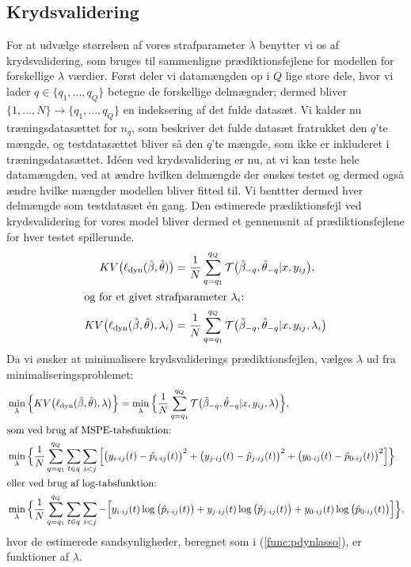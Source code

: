 \documentclass[11pt,a4paper]{article}
\begin{document}
\subsection{Krydsvalidering}
For at udvælge størrelsen af vores strafparameter $\lambda$ benytter vi os af krydsvalidering, som bruges til sammenligne prædiktionsfejlene for modellen for forskellige $\lambda$ værdier. Først deler vi datamængden op i $Q$ lige store dele, hvor vi lader $q\in \{q_1,...,q_Q\}$ betegne de forskellige delmægnder; dermed bliver $\{1,...,N\}\rightarrow\{q_1,...,q_Q\}$ en indeksering af det fulde datasæt. Vi kalder nu træningsdatasættet for $n_q$, som beskriver det fulde datasæt fratrukket den $q$'te mængde, og testdatasættet bliver så den $q$'te mængde, som ikke er inkluderet i træningsdatasættet. Idéen ved krydsvalidering er nu, at vi kan teste hele datamængden, ved at ændre hvilken delmængde der ønskes testet og dermed også ændre hvilke mængder modellen bliver fitted til. Vi benttter dermed hver delmængde som testdatasæt én gang. Den estimerede prædiktionsfejl ved krydsvalidering for vores model bliver dermed et gennemsnit
af prædiktionsfejlene for hver testet spillerunde. 
\begin{align*}
KV\big{(}\ell_{\text{dyn}}(\hat{\beta},\hat{\theta})\big{)}&=\frac{1}{N}\sum_{q=q_1}^{q_Q}\mathcal{T}\big{(}\hat{\beta}_{-q},\hat{\theta}_{-q}|x,y_{ij}\big{)},\\
\intertext{og for et givet strafparameter $\lambda_i$:}
KV\big{(}\ell_{\text{dyn}}(\hat{\beta},\hat{\theta}),\lambda_i\big{)}&=\frac{1}{N}\sum_{q=q_1}^{q_Q}\mathcal{T}\big{(}\hat{\beta}_{-q},\hat{\theta}_{-q}|x,y_{ij},\lambda_i\big{)}
\end{align*}
Da vi ønsker at minimalisere krydsvaliderings prædiktionsfejlen, vælges $\lambda$ ud fra minimaliseringsproblemet:
\begin{align*}
&\min_{\lambda}\Big{\{}KV\big{(}\ell_{\text{dyn}}(\hat{\beta},\hat{\theta}),\lambda \big{)}\Big{\}}=\min_{\lambda}\Big{\{}\frac{1}{N}\sum_{q=q_1}^{q_Q}\mathcal{T}\big{(}\hat{\beta}_{-q},\hat{\theta}_{-q}|x,y_{ij},\lambda\big{)}\Big{\}},\\
\intertext{som ved brug af MSPE-tabsfunktion:}
&\min_{\lambda}\Big{\{}\frac{1}{N}\sum_{q=q_1}^{q_Q}\sum_{t\in q}\sum_{i<j}\Big{[}\big{(}y_{i\cdot ij}(t)-\hat{p}_{i\cdot ij}(t)\big{)}^2+\big{(}y_{j\cdot ij}(t)-\hat{p}_{j\cdot ij}(t)\big{)}^2+\big{(}y_{0\cdot ij}(t)-\hat{p}_{0\cdot ij}(t)\big{)}^2\Big{]}\Big{\}}\\
\intertext{eller ved brug af log-tabsfunktion:}
&\min_{\lambda}\Big{\{}\frac{1}{N}\sum_{q=q_1}^{q_Q}\sum_{t\in q}\sum_{i<j}-\Big{[}y_{i\cdot ij}(t)\log\big{(}\hat{p}_{i\cdot ij}(t)\big{)}+y_{j\cdot ij}(t)\log\big{(}\hat{p}_{j\cdot ij}(t)\big{)}+y_{0\cdot ij}(t)\log\big{(}\hat{p}_{0\cdot ij}(t)\big{)}\Big{]}\Big{\}},
\end{align*}
hvor de estimerede sandsynligheder, beregnet som i (\ref{func:pdynlasso}), er funktioner af $\lambda$.
\end{document}
